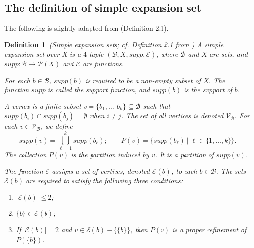 \documentclass{amsart}
\newtheorem{Definition}[theorem]{Definition}
\newtheorem{standing assumption}[theorem]{Standing Assumption}
\newenvironment{definition}{\begin{Definition}\normalfont}{\end{Definition}}
\begin{document}


\subsection{The definition of simple expansion set}

The following is slightly adapted from \cite{Farley} (Definition 2.1).

\begin{definition} \label{definition:simpleexpansionsets}
(Simple expansion sets; cf. Definition 2.1 from \cite{Farley}) 
A \emph{simple expansion set over $X$} is a $4$-tuple $(\mathcal{B}, X, supp, \mathcal{E})$, where $\mathcal{B}$ and $X$ are sets, and $supp: \mathcal{B} \rightarrow \mathcal{P}(X)$ and $\mathcal{E}$ are functions. 

For each $b \in \mathcal{B}$, $supp(b)$ is required to be a non-empty subset of $X$. The function $supp$ is called the \emph{support function}, and $supp(b)$ is the \emph{support} of $b$.  

A \emph{vertex} is a finite subset $v = \{ b_{1}, \ldots, b_{k}\} \subseteq \mathcal{B}$ such that $supp(b_{i}) \cap supp(b_{j}) = \emptyset$ when $i \neq j$. The set of all vertices is denoted $\mathcal{V}_{\mathcal{B}}$. For each $v \in \mathcal{V}_{\mathcal{B}}$, we define 
\[ supp(v) = \bigcup_{\ell =1}^{k} supp(b_{\ell}); \quad \quad  
P(v) = \{ supp(b_{\ell}) \mid \ell \in \{ 1, \ldots, k \} \}.  \]
The collection $P(v)$ is the \emph{partition induced by $v$}. It is a partition of $supp(v)$.

 The function $\mathcal{E}$ assigns a set of vertices, denoted $\mathcal{E}(b)$, to each $b \in \mathcal{B}$. 
 The sets $\mathcal{E}(b)$ are required to satisfy the following three conditions:
\begin{enumerate}
\item $|\mathcal{E}(b)| \leq 2$;
\item $ \{ b \} \in \mathcal{E}(b)$;
\item If $|\mathcal{E}(b)| = 2$ and $v \in \mathcal{E}(b) - \{ \{ b \} \}$, 
then $P(v)$ is a proper refinement of $P(\{ b \})$. 
\end{enumerate}
\end{definition}
\end{document}
